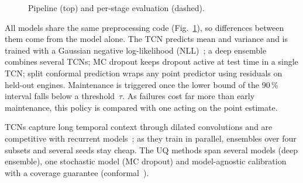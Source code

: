 \documentclass[10pt,twocolumn,a4paper]{article}
\begin{document}
\begin{figure}[!htb]
  \caption{Pipeline (top) and per-stage evaluation (dashed).}
  \label{fig:method}
\end{figure}
All models share the same preprocessing code (Fig.~\ref{fig:method}), so differences
between them come from the model alone. The TCN predicts mean and variance and is
trained with a Gaussian negative log-likelihood (NLL)~\cite{lakshminarayanan2017}; a deep ensemble
combines several TCNs; MC dropout keeps dropout active at test time in a single TCN; split
conformal prediction wraps any point predictor using residuals on held-out engines.
Maintenance is triggered once the lower bound of the 90\,\% interval falls below a threshold~$\tau$.
As failures cost far more than early maintenance, this policy is compared with one acting on the
point estimate.

TCNs capture long temporal context through dilated convolutions and are competitive with
recurrent models~\cite{bai2018}; as they train in parallel, ensembles over four subsets and
several seeds stay cheap. The UQ methods span several models (deep ensemble), one stochastic
model (MC dropout) and model-agnostic calibration with a coverage guarantee
(conformal~\cite{javanmardi2023conformal}).

\end{document}
